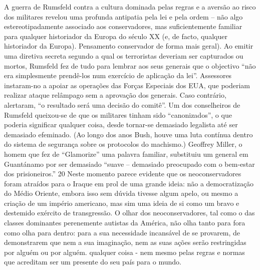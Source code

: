  
\par
 
A guerra de Rumsfeld contra a cultura dominada pelas regras e a aversão ao risco dos militares revelou uma profunda antipatia pela lei e pela ordem – não algo estereotipadamente associado aos conservadores, mas suficientemente familiar para qualquer historiador da Europa do século XX (e, de facto, qualquer historiador da Europa). Pensamento conservador de forma mais geral). Ao emitir uma diretiva secreta segundo a qual os terroristas deveriam ser capturados ou mortos, Rumsfeld fez de tudo para lembrar aos seus generais que o objectivo “não era simplesmente prendê-los num exercício de aplicação da lei”. Assessores instaram-no a apoiar as operações das Forças Especiais dos EUA, que poderiam realizar ataque relâmpago sem a aprovação dos generais. Caso contrário, alertaram, “o resultado será uma decisão do comitê”. Um dos conselheiros de Rumsfeld queixou-se de que os militares tinham sido “canonizados”, o que poderia significar qualquer coisa, desde tornar-se demasiado legalista até ser demasiado efeminado. (Ao longo dos anos Bush, houve uma luta contínua dentro do sistema de segurança sobre os protocolos do machismo.) Geoffrey Miller, o homem que fez de “Glamorize” uma palavra familiar, substituiu um general em Guantánamo por ser demasiado “suave – demasiado preocupado com o bem-estar dos prisioneiros.”
 {\color{blue} 20}  
Neste momento parece evidente que os neoconservadores foram atraídos para o Iraque em prol de uma grande ideia: não a democratização do Médio Oriente, embora isso sem dúvida tivesse algum apelo, ou mesmo a criação de um império americano, mas sim uma ideia de si como um bravo e destemido exército de transgressão. O olhar dos neoconservadores, tal como o das classes dominantes perenemente autistas da América, não olha tanto para fora como olha para dentro: para a sua necessidade incansável de se provarem, de demonstrarem que nem a sua imaginação, nem as suas ações serão restringidas por alguém ou por alguém. qualquer coisa - nem mesmo pelas regras e normas que acreditam ser um presente do seu país para o mundo.
 
\par
 
